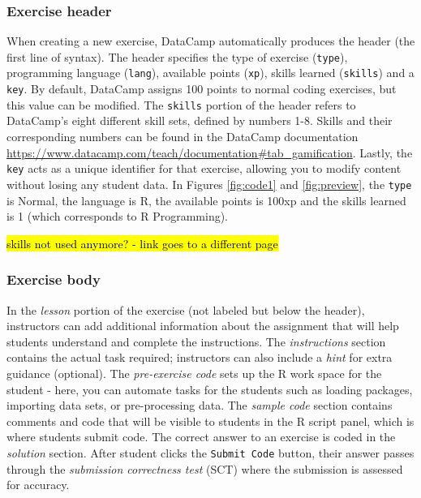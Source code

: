 \documentclass{tise_style_doi}
\begin{document}
\subsubsection{Exercise header}

When creating a new exercise, DataCamp automatically produces the header (the first line
of syntax). The header specifies the type of exercise (\texttt{type}), programming
language (\texttt{lang}), available points (\texttt{xp}), skills learned (\texttt{skills})
and a \texttt{key}. By default, DataCamp assigns 100 points to normal coding exercises,
but this value can be modified. The \texttt{skills} portion of the header refers to DataCamp's
eight different skill sets, defined by numbers 1-8. Skills and their corresponding
numbers can be found in the DataCamp documentation
\url{https://www.datacamp.com/teach/documentation#tab_gamification}.
Lastly, the \texttt{key} acts as a unique identifier for that exercise, allowing you
to modify content without losing any student data. In Figures \ref{fig:code1} and
\ref{fig:preview}, the \texttt{type} is Normal, the language is R,
the available points is 100xp and the skills learned is 1 (which corresponds to R Programming).

\hl{skills not used anymore? - link goes to a different page}

\subsubsection{Exercise body}

In the \textit{lesson} portion of the exercise (not labeled but below the header),
instructors can add additional information about the assignment that will help
students understand and complete the instructions. The \textit{instructions} section
contains the actual task required; instructors can also include
a \textit{hint} for extra guidance (optional). The \textit{pre-exercise code} sets up
the R work space for the student - here, you can automate tasks for the students such
as loading packages, importing data sets, or pre-processing data. The \textit{sample code} 
section contains comments and code that will be visible to students in the R script 
panel, which is where students submit code.  The correct answer to an exercise is 
coded in the \textit{solution} section.  After student clicks the \texttt{Submit Code}
 button, their answer passes through the \textit{submission correctness test} (SCT) 
where the submission is assessed for accuracy.
\end{document}
